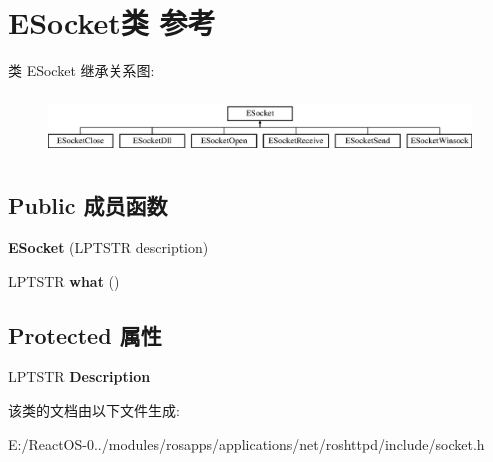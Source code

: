 \hypertarget{class_e_socket}{}\section{E\+Socket类 参考}
\label{class_e_socket}
类 E\+Socket 继承关系图\+:\begin{figure}[H]
\begin{center}
\leavevmode
\includegraphics[height=1.651917cm]{class_e_socket}
\end{center}
\end{figure}
\subsection*{Public 成员函数}
\begin{DoxyCompactItemize}
\item 
\mbox{\label{class_e_socket_a2a70e42540413b62a8f4879805bee9b0}} 
{\bfseries E\+Socket} (L\+P\+T\+S\+TR description)
\item 
\mbox{\label{class_e_socket_a130878dc232065f01b4980490414bb5a}} 
L\+P\+T\+S\+TR {\bfseries what} ()
\end{DoxyCompactItemize}
\subsection*{Protected 属性}
\begin{DoxyCompactItemize}
\item 
\mbox{\label{class_e_socket_a306da743fe2df6f2126b5b170d24b81c}} 
L\+P\+T\+S\+TR {\bfseries Description}
\end{DoxyCompactItemize}


该类的文档由以下文件生成\+:\begin{DoxyCompactItemize}
\item 
E\+:/\+React\+O\+S-\/0../modules/rosapps/applications/net/roshttpd/include/socket.\+h\end{DoxyCompactItemize}
